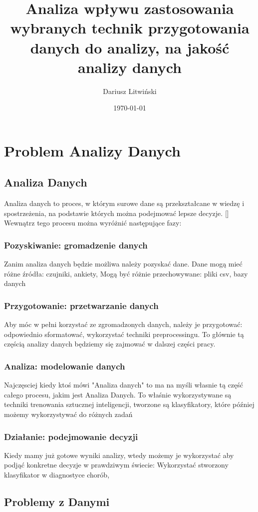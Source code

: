 \documentclass{article}
\title{Analiza wpływu zastosowania wybranych technik przygotowania danych do analizy, na jakość analizy danych}
\author{Dariusz Litwiński}
\date{\today}
\begin{document}
\maketitle
\section{Problem Analizy Danych}

\subsection{Analiza Danych}
Analiza danych to proces, w którym surowe dane są przekształcane w wiedzę i spostrzeżenia, na podstawie których można podejmować lepsze decyzje. []
Wewnątrz tego procesu można wyróżnić następujące fazy:
\subsubsection{Pozyskiwanie: gromadzenie danych}
Zanim analiza danych będzie możliwa należy pozyskać dane.
Dane mogą mieć różne źródła: czujniki, ankiety, 
Mogą być różnie przechowywane: pliki csv, bazy danych
\subsubsection{Przygotowanie: przetwarzanie danych}
Aby móc w pełni korzystać ze zgromadzonych danych, należy je przygotować: odpowiednio sformatować, wykorzystać techniki preprocessingu. To głównie tą częścią analizy danych będziemy się zajmować w dalszej części pracy. 
\subsubsection{Analiza: modelowanie danych}
Najczęsciej kiedy ktoś mówi "Analiza danych" to ma na myśli własnie tą część całego procesu, jakim jest Analiza Danych. To właśnie wykorzystywane są techniki trenowania sztucznej inteligencji, tworzone są klasyfikatory, które później możemy wykorzystywać do różnych zadań
\subsubsection{Działanie: podejmowanie decyzji}
Kiedy mamy już gotowe wyniki analizy, wtedy możemy je wykorzystać aby podjąć konkretne decyzje w prawdziwym świecie: Wykorzystać stworzony klasyfikator w diagnostyce chorób, 

\subsection{Problemy z Danymi}
\end{document}
